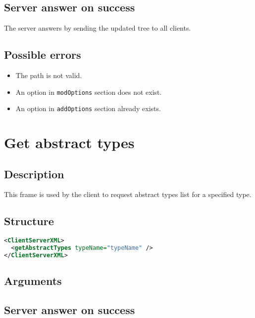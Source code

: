 \subsection{Server answer on success}

The server answers by sending the updated tree  to all
clients.

\subsection{Possible errors}

\begin{itemize}
 \item The path is not valid.
 \item An option in \texttt{modOptions} section does not exist.
 \item An option in \texttt{addOptions} section already exists.
\end{itemize}


\section{Get abstract types}
\label{getAbstractType}

\subsection{Description}

This frame is used by the client to request abstract types list for a specified
type.

\subsection{Structure}

\begin{lstlisting}[language=XML]
<ClientServerXML>
  <getAbstractTypes typeName="typeName" />
</ClientServerXML>
\end{lstlisting}

\subsection{Arguments}

\subsection{Server answer on success}

